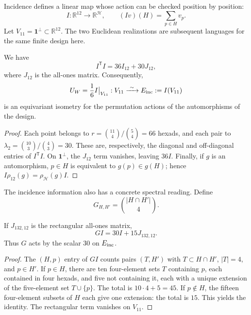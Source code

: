 Incidence defines a linear map whose action can be checked
position by position:
\begin{equation}
 I:\mathbb R^{12}\longrightarrow\mathbb R^{\mathcal H},
 \qquad (Iv)(H)=\sum_{p\in H}v_p.
 \label{exc:incidencia}
\end{equation}
Let $V_{11}=\mathbf1^\perp\subset\mathbb R^{12}$. The two Euclidean
realizations are subsequent languages for the same finite design here.

\begin{proposition}
\label{exc:isometria}
We have
\[
 I^{\mathsf T}I=36I_{12}+30J_{12},
\]
where $J_{12}$ is the all-ones matrix. Consequently,
\[
 U_W=\frac16 I\big|_{V_{11}}:
 V_{11}\xrightarrow{\ \sim\ }E_{\rm inc}:=I(V_{11})
\]
is an equivariant isometry for the permutation actions of the
automorphisms of the design.
\end{proposition}

\begin{proof}
Each point belongs to
$r=\binom{11}{4}/\binom54=66$ hexads, and each pair to
$\lambda_2=\binom{10}{3}/\binom43=30$. These are, respectively, the
diagonal and off-diagonal entries of $I^{\mathsf T}I$. On
$\mathbf1^\perp$, the $J_{12}$ term vanishes, leaving $36I$.
Finally, if $g$ is an automorphism, $p\in H$ is equivalent to
$g(p)\in g(H)$; hence $I\rho_{12}(g)=\rho_{\mathcal H}(g)I$.
\end{proof}

The incidence information also has a concrete spectral
reading. Define
\[
 G_{H,H'}=\binom{|H\cap H'|}{4}.
\]

\begin{lemma}
\label{exc:espectro}
If $J_{132,12}$ is the rectangular all-ones matrix,
\[
 GI=30I+15J_{132,12}.
\]
Thus $G$ acts by the scalar $30$ on $E_{\rm inc}$.
\end{lemma}

\begin{proof}
The $(H,p)$ entry of $GI$ counts pairs $(T,H')$ with
$T\subset H\cap H'$, $|T|=4$, and $p\in H'$. If $p\in H$, there are ten
four-element sets $T$ containing $p$, each contained in four hexads,
and five not containing it, each with a unique extension of the
five-element set $T\cup\{p\}$. The total is $10\cdot4+5=45$.
If $p\notin H$, the fifteen four-element subsets of $H$ each give one extension:
the total is $15$. This yields the identity. The rectangular term
vanishes on $V_{11}$.
\end{proof}

